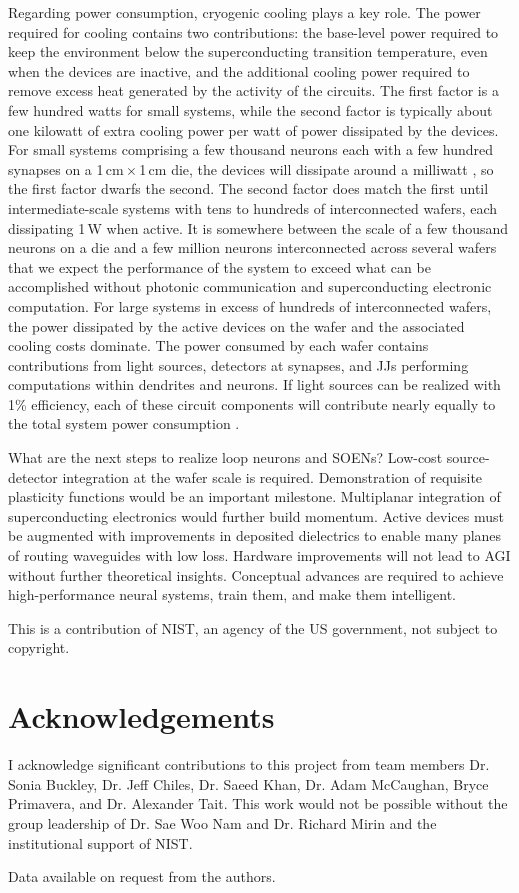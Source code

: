 \documentclass[twocolumn]{article}
\begin{document}
Regarding power consumption, cryogenic cooling plays a key role. The power required for cooling  contains two contributions: the base-level power required to keep the environment below the superconducting transition temperature, even when the devices are inactive, and the additional cooling power required to remove excess heat generated by the activity of the circuits. The first factor is a few hundred watts for small systems, while the second factor is typically about one kilowatt of extra cooling power per watt of power dissipated by the devices. For small systems comprising a few thousand neurons each with a few hundred synapses on a 1\,cm\,$\times$\,1\,cm die, the devices will dissipate around a milliwatt \cite{sh2019}, so the first factor dwarfs the second. The second factor does match the first until intermediate-scale systems with tens to hundreds of interconnected wafers, each dissipating 1\,W when active. It is somewhere between the scale of a few thousand neurons on a die and a few million neurons interconnected across several wafers that we expect the performance of the system to exceed what can be accomplished without photonic communication and superconducting electronic computation. For large systems in excess of hundreds of interconnected wafers, the power dissipated by the active devices on the wafer and the associated cooling costs dominate. The power consumed by each wafer contains contributions from light sources, detectors at synapses, and JJs performing computations within dendrites and neurons. If light sources can be realized with 1\% efficiency, each of these circuit components will contribute nearly equally to the total system power consumption \cite{sh2020}.

What are the next steps to realize loop neurons and SOENs? Low-cost source-detector integration at the wafer scale is required. Demonstration of requisite plasticity functions would be an important milestone. Multiplanar integration of superconducting electronics would further build momentum. Active devices must be augmented with improvements in deposited dielectrics to enable many planes of routing waveguides with low loss. Hardware improvements will not lead to AGI without further theoretical insights. Conceptual advances are required to achieve high-performance neural systems, train them, and make them intelligent.

\vspace{2em}
This is a contribution of NIST, an agency of the US government, not subject to copyright.

\section{\label{sec:acknowledgements}Acknowledgements}
I acknowledge significant contributions to this project from team members Dr. Sonia Buckley, Dr. Jeff Chiles, Dr. Saeed Khan, Dr. Adam McCaughan, Bryce Primavera, and Dr. Alexander Tait. This work would not be possible without the group leadership of Dr. Sae Woo Nam and Dr. Richard Mirin and the institutional support of NIST.

\vspace{2em}
Data available on request from the authors.



\end{document}
